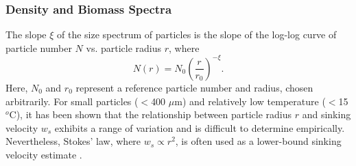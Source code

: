 \documentclass[article,linenumbers]{agujournal2018}
\begin{document}
	\subsubsection{Density and Biomass Spectra}
	\label{sec: equations_biomass}
	The slope $\xi$ of the size spectrum of particles \citep[also know as the Junge slope;][]{White_2015} is the slope of the log-log curve of particle number $N$ vs. particle radius $r$, where
	\begin{equation}
		N(r) = N_0 \left(\frac{r}{r_0}\right)^{-\xi}.
		\label{eq: powerlaw_radius}
	\end{equation}
	Here, $N_0$ and $r_0$ represent a reference particle number and radius, chosen arbitrarily. For small particles ($<$400 $\mu$m) and relatively low temperature ($<$15$^o$C), it has been shown that the relationship between particle radius $r$ and sinking velocity $w_s$ exhibits a range of variation and is difficult to determine empirically. Nevertheless, Stokes' law, where $w_s \propto r^2$, is often used as a lower-bound sinking velocity estimate \citep{Bach_2012}.
	
\end{document}

